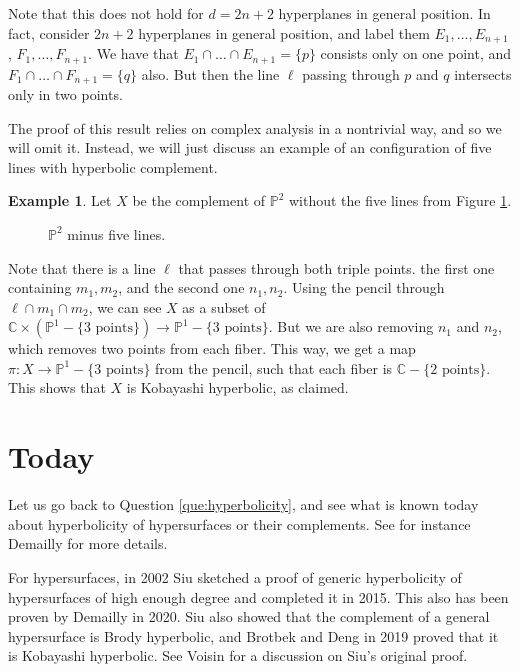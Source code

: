 \documentclass[leqno, openany]{memoir}
\theoremstyle{definition}
\newtheorem{exm}[thm]{Example}
\theoremstyle{remark}
\theoremstyle{plain}
\theoremstyle{definition}
\theoremstyle{remark}
\renewcommand{\P}{\mathbb{P}}
\begin{document}
Note that this does not hold for $d=2n+2$ hyperplanes in general position. In fact, consider $2n+2$ hyperplanes in general position, and label them $E_1, \dots, E_{n+1}$, $F_1, \dots, F_{n+1}$. We have that $E_1 \cap \dots \cap E_{n+1}=\{p\}$ consists only on one point, and $F_1 \cap \dots \cap F_{n+1}=\{q\}$ also. But then the line $\ell$ passing through $p$ and $q$ intersects only in two points. 

The proof of this result relies on complex analysis in a nontrivial way, and so we will omit it. Instead, we will just discuss an example of an configuration of five lines with hyperbolic complement. 

\begin{exm}
Let $X$ be the complement of $\P^2$ without the five lines from Figure \ref{fig:cincolineas}.
\begin{figure}[H]
\centering
{}
\caption{$\P^2$ minus five lines.}
\label{fig:cincolineas}
\end{figure}
Note that there is a line $\ell$ that passes through both triple points. the first one containing $m_1, m_2$, and the second one $n_1, n_2$. Using the pencil through $\ell \cap m_1 \cap m_2$, we can see $X$ as a subset of $\mathbb{C} \times (\P^1-\{3\text{ points}\}) \to \P^1 - \{3 \text{ points}\}$. But we are also removing $n_1$ and $n_2$, which removes two points from each fiber. This way, we get a map $\pi\colon X \to \P^1-\{3 \text{ points}\}$ from the pencil, such that each fiber is $\mathbb{C}-\{2 \text{ points}\}$. This shows that $X$ is Kobayashi hyperbolic, as claimed. 
\end{exm}

\section{Today}

Let us go back to Question \ref{que:hyperbolicity}, and see what is known today about hyperbolicity of hypersurfaces or their complements. See for instance Demailly for more details. 

For hypersurfaces, in 2002 Siu sketched a proof of generic hyperbolicity of hypersurfaces of high enough degree and completed it in 2015. This also has been proven by Demailly in 2020. Siu also showed that the complement of a general hypersurface is Brody hyperbolic, and Brotbek and Deng in 2019 proved that it is Kobayashi hyperbolic. See Voisin for a discussion on Siu's original proof.
\end{document}
